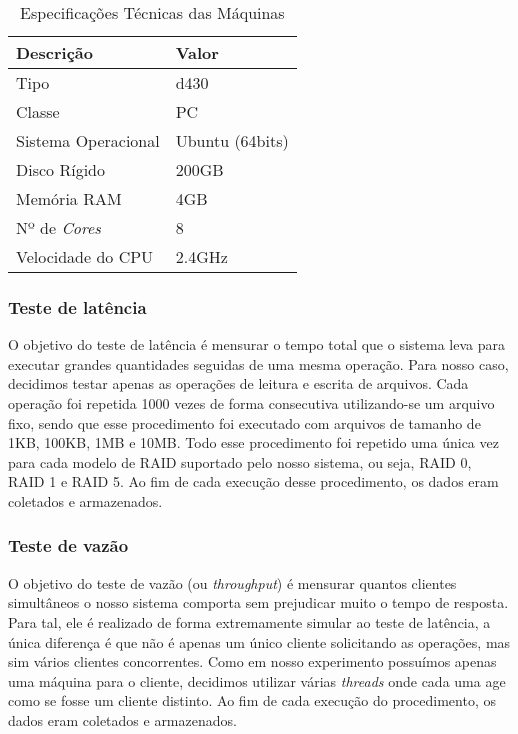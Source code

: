 	\capstartfalse
	\begin{table} [htb]
		\caption{Especificações Técnicas das Máquinas}
		\centering
		\begin{tabular}{|l|l|} \hline
			\textbf{Descrição} 	& \textbf{Valor} \\ \hline
			
			Tipo				& d430\\ \hline
			Classe				& PC\\ \hline
			Sistema Operacional & Ubuntu (64bits)\\ \hline
			Disco Rígido		& 200GB \\ \hline
			Memória RAM			& 4GB \\ \hline
			Nº de \textit{Cores}& 8 \\ \hline
			Velocidade do CPU	& 2.4GHz  \\ \hline
						
		\end{tabular}
		\label{tab:exp_vm}
	\end{table}
	\capstarttrue
	

	\subsubsection{Teste de latência}
	O objetivo do teste de latência é mensurar o tempo total que o sistema leva para executar grandes quantidades seguidas de uma mesma operação. Para nosso caso, decidimos testar apenas as operações de leitura e escrita de arquivos. Cada operação foi repetida 1000 vezes de forma consecutiva utilizando-se um arquivo fixo, sendo que esse procedimento foi executado com arquivos de tamanho de 1KB, 100KB, 1MB e 10MB. Todo esse procedimento foi repetido uma única vez para cada modelo de RAID suportado pelo nosso sistema, ou seja, RAID 0, RAID 1 e RAID 5. Ao fim de cada execução desse procedimento, os dados eram coletados e armazenados.
	\\
	
	\subsubsection{Teste de vazão}	
	O objetivo do teste de vazão (ou \textit{throughput}) é mensurar quantos clientes simultâneos o nosso sistema comporta sem prejudicar muito o tempo de resposta. Para tal, ele é realizado de forma extremamente simular ao teste de latência, a única diferença é que não é apenas um único cliente solicitando as operações, mas sim vários clientes concorrentes. Como em nosso experimento possuímos apenas uma máquina para o cliente, decidimos utilizar várias \textit{threads} onde cada uma age como se fosse um cliente distinto. Ao fim de cada execução do procedimento, os dados eram coletados e armazenados.
	\\
	